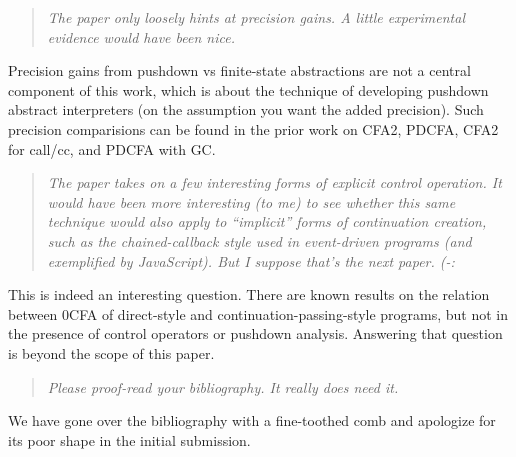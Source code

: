 \begin{titlepage}
\begin{quote}
\emph{The paper only loosely hints at precision gains. A little experimental
evidence would have been nice.}
\end{quote}

Precision gains from pushdown vs finite-state abstractions are not a
central component of this work, which is about the technique of
developing pushdown abstract interpreters (on the assumption you want
the added precision).  Such precision comparisions can be found in the
prior work on CFA2, PDCFA, CFA2 for call/cc, and PDCFA with GC.

\begin{quote}
\emph{
The paper takes on a few interesting forms of explicit control
  operation. It would have been more interesting (to me) to see
  whether this same technique would also apply to ``implicit'' forms of
  continuation creation, such as the chained-callback style used in
  event-driven programs (and exemplified by JavaScript). But I suppose
  that's the next paper. (-:}
\end{quote}

This is indeed an interesting question.  There are known results on
the relation between 0CFA of direct-style and
continuation-passing-style programs, but not in the presence of
control operators or pushdown analysis.  Answering that question is
beyond the scope of this paper.

\begin{quote}
\emph{
Please proof-read your bibliography. It really does need it.}
\end{quote}

We have gone over the bibliography with a fine-toothed comb and
apologize for its poor shape in the initial submission.



\end{titlepage}

